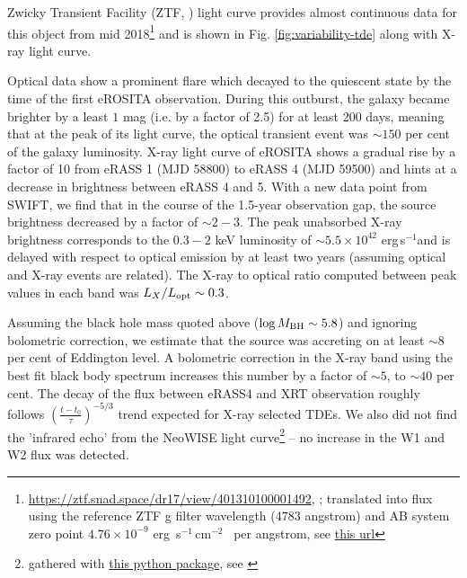\documentclass[fleqn,usenatbib]{mnras}
\newcommand{\ergps}{erg\,s$^{-1}$}
\newcommand{\ergpspcm}{erg \,s$^{-1}$\,cm$^{-2}$}
\begin{document}
Zwicky Transient Facility (ZTF, \citealt{Bellm2019}) light curve provides almost continuous data for this object from mid 2018\footnote{\url{https://ztf.snad.space/dr17/view/401310100001492},  \citep{Malanchev2023}; translated into flux using the reference ZTF g filter wavelength ($4783$ angstrom) and AB system zero point $4.76\times10^{-9}$ \ergpspcm ~ per angstrom, see \href{http://svo2.cab.inta-csic.es/theory/fps/index.php?id=Palomar/ZTF.g}{this url} } and is shown in Fig. \ref{fig:variability-tde} along with X-ray light curve. 

Optical data show a prominent flare which decayed to the quiescent state by the time of the first eROSITA observation. During this outburst, the galaxy became brighter by a least $1$ mag (i.e. by a factor of 2.5) for at least  200 days, meaning that at the peak of its light curve, the optical transient event was $\sim150$ per cent of the galaxy luminosity. X-ray light curve of eROSITA shows a gradual rise by a factor of 10 from eRASS 1 (MJD 58800) to eRASS 4 (MJD 59500) and hints at a decrease in brightness between eRASS 4 and 5. With a new data point from SWIFT, we find that in the course of the 1.5-year observation gap, the source brightness decreased by a factor of $\sim 2-3$.  The peak unabsorbed X-ray brightness corresponds to the $0.3-2$ keV luminosity of $\sim5.5\times10^{42}$ \ergps and is delayed with respect to optical emission by at least two years (assuming optical and X-ray events are related). The X-ray to optical ratio computed between peak values in each  band was $L_X/L_{\rm opt}\sim 0.3$.

Assuming the black hole mass quoted above ($\log M_{\rm BH}\sim5.8$) and ignoring bolometric correction, we estimate that the source was accreting on at least $\sim8$ per cent of Eddington level. A bolometric correction in the X-ray band using the best fit black body spectrum increases this number by a factor of $\sim 5$, to $\sim 40$ per cent.  The decay of the flux between eRASS4 and XRT observation roughly follows $\left(\frac{t-t_0}{\tau}\right)^{-5/3}$ trend expected for X-ray selected TDEs.  We also did not find the 'infrared echo' from the NeoWISE light curve\footnote{gathered with \href{https://github.com/HC-Hwang/wise_light_curves}{this python package}, see \citet{Hwang2020}} -- no increase in the W1 and W2 flux was detected.
\end{document}
